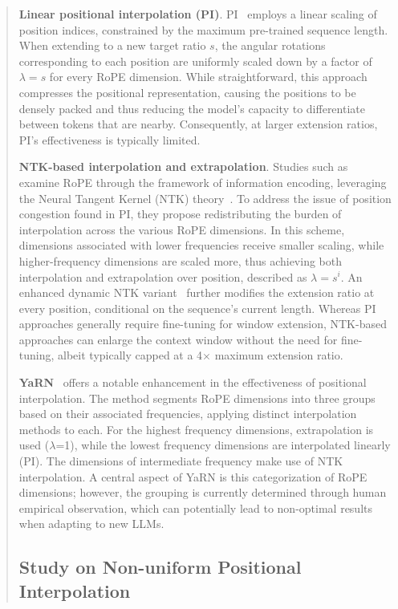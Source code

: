 \begin{abstract}
\textbf{Linear positional interpolation (PI)}. PI~\cite{pi} employs a linear scaling of position indices, constrained by the maximum pre-trained sequence length. When extending to a new target ratio $s$, the angular rotations corresponding to each position are uniformly scaled down by a factor of $\lambda=s$ for every RoPE dimension. While straightforward, this approach compresses the positional representation, causing the positions to be densely packed and thus reducing the model’s capacity to differentiate between tokens that are nearby. Consequently, at larger extension ratios, PI's effectiveness is typically limited.

\textbf{NTK-based interpolation and extrapolation}. Studies such as~\cite{ntk,dynamicntk} examine RoPE through the framework of information encoding, leveraging the Neural Tangent Kernel (NTK) theory~\cite{jacot2018neural,tancik2020fourier}. To address the issue of position congestion found in PI, they propose redistributing the burden of interpolation across the various RoPE dimensions. In this scheme, dimensions associated with lower frequencies receive smaller scaling, while higher-frequency dimensions are scaled more, thus achieving both interpolation and extrapolation over position, described as $\lambda=s^{i}$. An enhanced dynamic NTK variant~\cite{dynamicntk} further modifies the extension ratio at every position, conditional on the sequence's current length. Whereas PI approaches generally require fine-tuning for window extension, NTK-based approaches can enlarge the context window without the need for fine-tuning, albeit typically capped at a 4$\times$ maximum extension ratio.

\textbf{YaRN}~\cite{yarn} offers a notable enhancement in the effectiveness of positional interpolation. The method segments RoPE dimensions into three groups based on their associated frequencies, applying distinct interpolation methods to each. For the highest frequency dimensions, extrapolation is used ($\lambda$=1), while the lowest frequency dimensions are interpolated linearly (PI). The dimensions of intermediate frequency make use of NTK interpolation. A central aspect of YaRN is this categorization of RoPE dimensions; however, the grouping is currently determined through human empirical observation, which can potentially lead to non-optimal results when adapting to new LLMs.

\subsection{Study on Non-uniform Positional Interpolation}


\end{abstract}
